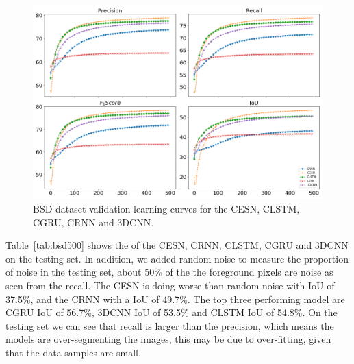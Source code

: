 \documentclass{WitsPhysicsReport}
\begin{document}
\begin{figure}[H]
\centering
  \includegraphics[width=1\textwidth]{Figure/Results/BSR_performance.png}
\caption{BSD dataset validation learning curves for the CESN, CLSTM, CGRU, CRNN and 3DCNN.} \label{fig:BSD_model_perfomance}
\end{figure}



Table~\ref{tab:bsd500} shows the of the CESN, CRNN, CLSTM, CGRU and 3DCNN on the testing set. In addition, we added random noise to measure the proportion of noise in the testing set, about 50\% of the the foreground pixels are noise as seen from the recall. The CESN is doing worse than random noise with IoU of 37.5\%, and the CRNN with a IoU of 49.7\%. The top three performing model are CGRU IoU of 56.7\%, 3DCNN IoU of 53.5\% and CLSTM IoU of 54.8\%. On the testing set we can see that recall is larger than the precision, which means the models are over-segmenting the images, this may be due to over-fitting, given that the data samples are small.
 
\begin{table}[H]
\centering
\caption{BSD testing results. Here we compare various models and noise is also included.}
    \label{tab:bsd500}
\end{table}
\end{document}
